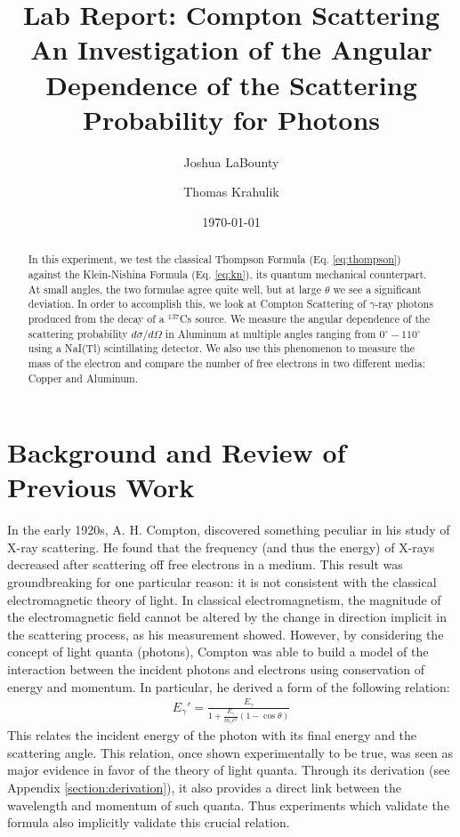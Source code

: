 \documentclass[%
 reprint,
 amsmath,amssymb,
 aps,
 pra,
]{revtex4-1}
\begin{document}

\title{\textbf{Lab Report: Compton Scattering} \\ \small{An Investigation of the Angular Dependence of the Scattering Probability for Photons}}
\author{Joshua LaBounty}
\author{Thomas Krahulik}

\date{\today}

\begin{abstract}
	In this experiment, we test the classical Thompson Formula (Eq. \ref{eq:thompson}) against the Klein-Nishina Formula (Eq. \ref{eq:kn}), its quantum mechanical counterpart. At small angles, the two formulae agree quite well, but at large $\theta$ we see a significant deviation. In order to accomplish this, we look at Compton Scattering of $\gamma$-ray photons produced from the decay of a $^{137}$Cs source. We measure the angular dependence of the scattering probability $d\sigma / d\Omega$ in Aluminum at multiple angles ranging from $0^\circ - 110^\circ$ using a NaI(Tl) scintillating detector. We also use this phenomenon to measure the mass of the electron and compare the number of free electrons in two different media: Copper and Aluminum.
\end{abstract}
\maketitle

\section{Background and Review of Previous Work}

In the early 1920s, A. H. Compton, discovered something peculiar in his study of X-ray scattering. He found that the frequency (and thus the energy) of X-rays decreased after scattering off free electrons in a medium. This result was groundbreaking for one particular reason: it is not consistent with the classical electromagnetic theory of light. In classical electromagnetism, the magnitude of the electromagnetic field cannot be altered by the change in direction implicit in the scattering process, as his measurement showed. However, by considering the concept of light quanta (photons), Compton was able to build a model of the interaction between the incident photons and electrons using conservation of energy and momentum. In particular, he derived a form of the following relation:
\begin{gather}\label{eq:energy_scatter}
	E_\gamma ' = \frac{E_\gamma}{1 + \frac{E_\gamma}{m_e c^2} (1 - \cos{\theta})}
\end{gather}
This relates the incident energy of the photon with its final energy and the scattering angle. This relation, once shown experimentally to be true, was seen as major evidence in favor of the theory of light quanta. Through its derivation (see Appendix \ref{section:derivation}), it also provides a direct link between the wavelength and momentum of such quanta. Thus experiments which validate the formula also implicitly validate this crucial relation.
\end{document}

